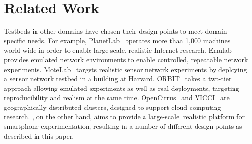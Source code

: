 \section{Related Work}
\label{sec:related}

Testbeds in other domains have chosen their design points
to meet domain-specific needs. For example, PlanetLab~\cite{peterson:ccr:2003,
planetlab} operates more than 1,000 machines world-wide in order to enable
large-scale, realistic Internet research. Emulab~\cite{white:osdi:2002, emulab}
provides emulated network environments to enable controlled, repeatable network
experiments. MoteLab~\cite{werner-allen:ipsn:2005} targets realistic sensor
network experiments by deploying a sensor network testbed in a building at
Harvard. ORBIT~\cite{raychaudhuri:tridentcom:2005} takes a two-tier approach
allowing emulated experiments as well as real deployments, targeting
reproducibility and realism at the same time.
OpenCirrus~\cite{avetisyan:computer:2010, opencirrus} and VICCI~\cite{vicci} are
geographically distributed clusters, designed to support cloud computing
research. \PhoneLab{}, on the other hand, aims to provide a large-scale,
realistic platform for smartphone experimentation, resulting in a number of
different design points as described in this paper.

%
